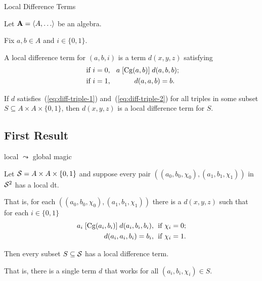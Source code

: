 \documentclass[notes=hide,12pt,xcolor=dvipsnames%
   ]{beamer}
\renewcommand{\defn}[1]{\alert{#1}}
\newcommand{\bigpause}{\pause\bigskip}
\newcommand{\medpause}{\pause\medskip}
\theoremstyle{definition}
\begin{document}
\begin{frame}[label=local-diff-term-defs,shrink]{Local Difference Terms}

  Let $\bA=\< A, \dots\>$ be an algebra.

  Fix $a, b \in A$ and $i \in \{0,1\}$.

  A \defn{local difference term for $(a,b,i)$} is a term $d(x,y,z)$ satisfying
  \begin{align}
    \text{ if $i=0$, } \; & \; a \mathrel{[\operatorname{Cg}(a,b)]} d(a,b,b); \label{eq:diff-triple-1}\\
    \text{ if $i=1$, } \; & \hskip1cm d(a,a,b) = b. \label{eq:diff-triple-2}
  \end{align}

  \bigpause
  If $d$ satisfies~(\ref{eq:diff-triple-1}) and~(\ref{eq:diff-triple-2}) for all triples
  in some subset $S\subseteq A \times A \times \{0,1\}$, then $d(x,y,z)$ is a
  \defn{local difference term for $S$}.
\end{frame}


\subsection{First Result}

\begin{frame}[label=local-diff-term-res]{local $\leadsto$ global magic}%

  Let 
  $\mathcal{S} = A \times A \times \{0,1\}$ and
  suppose every pair
  $((a_0, b_0, \chi_0), (a_1, b_1, \chi_1))$
  in $\mathcal{S}^2$ has a local dt.

  \medskip

  That is, for each $((a_0, b_0, \chi_0), (a_1, b_1, \chi_1))$
  there is a $d(x,y,z)$ such that for each $i \in \{0,1\}$
  \begin{align*}
    a_i \Comr{\Cg(a_i,b_i)} d(a_i,b_i,b_i), & \;
  \text{ if $\chi_i=0$;} \\%
  d(a_i,a_i,b_i) =b_i, & \;
  \text{ if $\chi_i=1$.}%
  \end{align*}
  
  \medpause
  Then every subset $S\subseteq \mathcal{S}$ has a local difference term.

  \vskip1mm
  That is, there is a single term $d$ that works 
  for all $(a_i, b_i, \chi_i) \in S$.
\end{frame}
\end{document}
